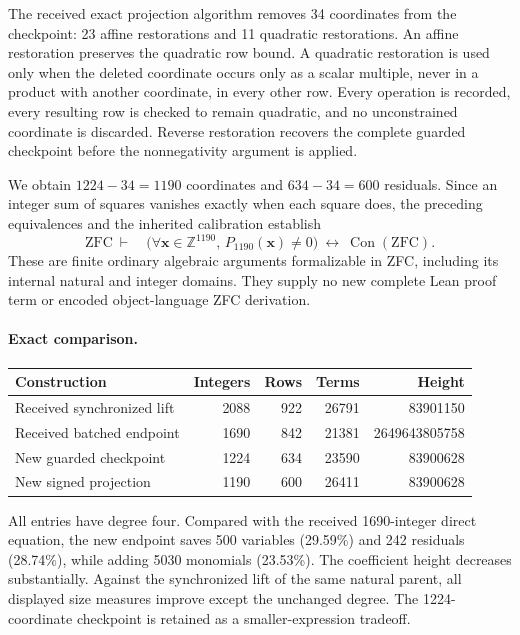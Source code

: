 The received exact projection algorithm removes 34 coordinates from
the checkpoint: 23 affine restorations and 11 quadratic restorations.
An affine restoration preserves the quadratic row bound. A quadratic
restoration is used only when the deleted coordinate occurs only as a
scalar multiple, never in a product with another coordinate, in every
other row. Every operation is recorded, every resulting row
is checked to remain quadratic, and no unconstrained coordinate is
discarded. Reverse restoration recovers the complete guarded checkpoint
before the nonnegativity argument is applied.

We obtain $1224-34=1190$ coordinates and $634-34=600$ residuals.
Since an integer sum of squares vanishes exactly when each square does,
the preceding equivalences and the inherited calibration establish
\[
 \mathrm{ZFC}\ \vdash\quad
 \bigl(\forall\boldsymbol x\in\mathbb Z^{1190},\,
              P_{1190}(\boldsymbol x)\ne0\bigr)
       \ \longleftrightarrow\ \operatorname{Con}(\mathrm{ZFC}).
\]
These are finite ordinary algebraic arguments formalizable in ZFC,
including its internal natural and integer domains. They supply no new
complete Lean proof term or encoded object-language ZFC derivation.

\paragraph{Exact comparison.}
\begin{center}
\small
\begin{tabular}{lrrrr}
Construction & Integers & Rows & Terms & Height\\
\hline
Received synchronized lift & 2088 & 922 & 26791 & 83901150\\
Received batched endpoint & 1690 & 842 & 21381 & 2649643805758\\
New guarded checkpoint & 1224 & 634 & 23590 & 83900628\\
New signed projection & 1190 & 600 & 26411 & 83900628
\end{tabular}
\end{center}
All entries have degree four. Compared with the received 1690-integer
direct equation, the new endpoint saves 500 variables (29.59\%) and
242 residuals (28.74\%), while adding 5030 monomials (23.53\%). The
coefficient height decreases substantially. Against the synchronized
lift of the same natural parent, all displayed size measures improve
except the unchanged degree. The 1224-coordinate checkpoint is retained
as a smaller-expression tradeoff.

